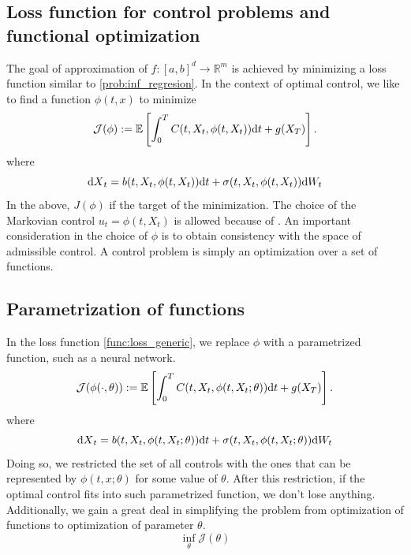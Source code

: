 \documentclass[11pt]{book}
\newcommand{\dt}{\text{\normalfont d}t}
\newcommand{\dX}{\text{\normalfont d}X}
\newcommand{\dW}{\text{\normalfont d}W}
\begin{document}
\subsection{Loss function for control problems and functional optimization}
The goal of  approximation of $f:[a,b]^d\to\mathbb{R}^m$ is achieved by minimizing a loss function similar to \eqref{prob:inf_regresion}. 
In the context of optimal control, we like to find a function $\phi(t,x)$ to minimize
\begin{equation}\label{func:loss_generic}
{\mathcal{J}}(\phi):=\mathbb{E}\left[\int_0^T C(t,X_t,\phi(t,X_t)){\dt}+g(X_T)\right].
\end{equation}
where 
\[
{\dX}_t =b(t,X_t,\phi(t,X_t)){\dt}+\sigma(t,X_t,\phi(t,X_t))\dW_t
\]
In the above, $J(\phi)$ if the target of the minimization. The choice of the Markovian control $u_t=\phi(t,X_t)$ is allowed because of \citet{el1987compactification,haussmann1986existence}. An important consideration in the choice of $\phi$ is to obtain consistency with the space of admissible control. 
A control problem is simply an optimization over a set of functions.
\subsection{Parametrization of functions}
In the loss function \eqref{func:loss_generic}, we replace $\phi$ with a parametrized function, such as  a neural network.
\begin{equation}\label{func:loss_parametrized}
{\mathcal{J}}(\phi(\cdot,\theta)):=\mathbb{E}\left[\int_0^T C(t,X_t,\phi(t,X_t;\theta)){\dt}+g(X_T)\right].
\end{equation}
where 
\[
{\dX}_t =b(t,X_t,\phi(t,X_t;\theta)){\dt}+\sigma(t,X_t,\phi(t,X_t;\theta))\dW_t
\]
Doing so, we restricted the set of all controls with the ones that can be represented by $\phi(t,x;\theta)$ for some value of $\theta$. After this restriction, if the optimal control fits into such parametrized function, we don't lose anything. Additionally, we gain a great deal in simplifying the problem from optimization of functions to optimization of parameter $\theta$.
\[
\inf_{\theta}\mathcal{J}(\theta)
\]
\end{document}
